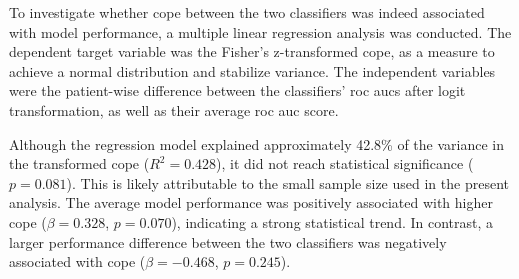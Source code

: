 To investigate whether \gls{cope} between the two classifiers was indeed associated with model performance, a multiple linear regression analysis was conducted. The dependent target variable was the Fisher's z-transformed \gls{cope}, as a measure to achieve a normal distribution and stabilize variance. The independent variables were the patient-wise difference between the classifiers’ \glspl{roc auc} after logit transformation, as well as their average \gls{roc auc} score. 

Although the regression model explained approximately 42.8\% of the variance in the transformed \gls{cope} (\(R^2 = 0.428\)), it did not reach statistical significance (\(p = 0.081\)). This is likely attributable to the small sample size used in the present analysis. The average model performance was positively associated with higher \gls{cope} (\(\beta = 0.328\), \(p = 0.070\)), indicating a strong statistical trend. In contrast, a larger performance difference between the two classifiers was negatively associated with \gls{cope} (\(\beta = -0.468\), \(p = 0.245\)).


\FloatBarrier